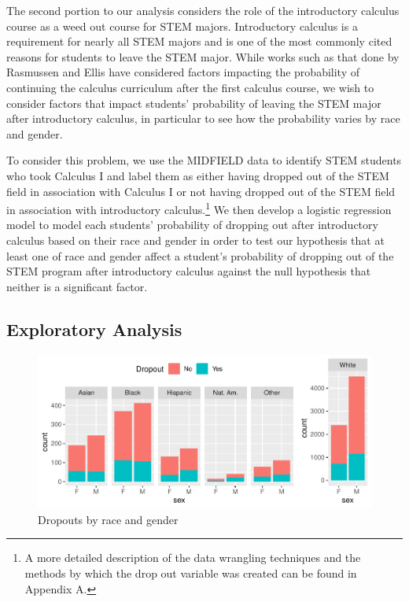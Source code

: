 \documentclass[]{article}
\begin{document}
The second portion to our analysis considers the role of the
introductory calculus course as a weed out course for STEM majors.
Introductory calculus is a requirement for nearly all STEM majors and is
one of the most commonly cited reasons for students to leave the STEM
major. \cite{paper} While works such as that done by Rasmussen and Ellis
have considered factors impacting the probability of continuing the
calculus curriculum after the first calculus course, we wish to consider
factors that impact students' probability of leaving the STEM major
after introductory calculus, in particular to see how the probability
varies by race and gender.

To consider this problem, we use the MIDFIELD data to identify STEM
students who took Calculus I and label them as either having dropped out
of the STEM field in association with Calculus I or not having dropped
out of the STEM field in association with introductory
calculus.\footnote{A more detailed description of the data wrangling techniques and the methods by which the drop out variable was created can be found in Appendix A.}
We then develop a logistic regression model to model each students'
probability of dropping out after introductory calculus based on their
race and gender in order to test our hypothesis that at least one of
race and gender affect a student's probability of dropping out of the
STEM program after introductory calculus against the null hypothesis
that neither is a significant factor.

\subsection{Exploratory Analysis}\label{exploratory-analysis}

\begin{figure}
\centering
\includegraphics{Stat_461_Final_Project_Report_files/figure-latex/comboplots-1.pdf}
\caption{Dropouts by race and gender}
\end{figure}
\end{document}
